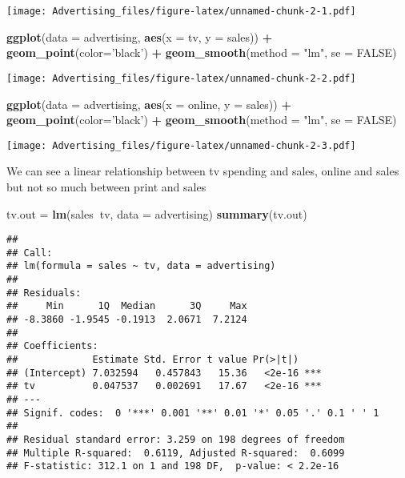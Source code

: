 \documentclass[
]{article}
\newenvironment{Shaded}{\begin{snugshade}}{\end{snugshade}}
\newcommand{\DataTypeTok}[1]{\textcolor[rgb]{0.13,0.29,0.53}{#1}}
\newcommand{\KeywordTok}[1]{\textcolor[rgb]{0.13,0.29,0.53}{\textbf{#1}}}
\newcommand{\NormalTok}[1]{#1}
\newcommand{\OperatorTok}[1]{\textcolor[rgb]{0.81,0.36,0.00}{\textbf{#1}}}
\newcommand{\OtherTok}[1]{\textcolor[rgb]{0.56,0.35,0.01}{#1}}
\newcommand{\StringTok}[1]{\textcolor[rgb]{0.31,0.60,0.02}{#1}}
\begin{document}
\texttt{[image: Advertising\_files/figure-latex/unnamed-chunk-2-1.pdf]}

\begin{Shaded}
\begin{Highlighting}[]
\KeywordTok{ggplot}\NormalTok{(}\DataTypeTok{data =}\NormalTok{ advertising, }\KeywordTok{aes}\NormalTok{(}\DataTypeTok{x =}\NormalTok{ tv, }\DataTypeTok{y =}\NormalTok{ sales)) }\OperatorTok{+}\StringTok{ }
\StringTok{  }\KeywordTok{geom_point}\NormalTok{(}\DataTypeTok{color=}\StringTok{'black'}\NormalTok{) }\OperatorTok{+}
\StringTok{  }\KeywordTok{geom_smooth}\NormalTok{(}\DataTypeTok{method =} \StringTok{"lm"}\NormalTok{, }\DataTypeTok{se =} \OtherTok{FALSE}\NormalTok{)}
\end{Highlighting}
\end{Shaded}

\texttt{[image: Advertising\_files/figure-latex/unnamed-chunk-2-2.pdf]}

\begin{Shaded}
\begin{Highlighting}[]
\KeywordTok{ggplot}\NormalTok{(}\DataTypeTok{data =}\NormalTok{ advertising, }\KeywordTok{aes}\NormalTok{(}\DataTypeTok{x =}\NormalTok{ online, }\DataTypeTok{y =}\NormalTok{ sales)) }\OperatorTok{+}\StringTok{ }
\StringTok{  }\KeywordTok{geom_point}\NormalTok{(}\DataTypeTok{color=}\StringTok{'black'}\NormalTok{) }\OperatorTok{+}
\StringTok{  }\KeywordTok{geom_smooth}\NormalTok{(}\DataTypeTok{method =} \StringTok{"lm"}\NormalTok{, }\DataTypeTok{se =} \OtherTok{FALSE}\NormalTok{)}
\end{Highlighting}
\end{Shaded}

\texttt{[image: Advertising\_files/figure-latex/unnamed-chunk-2-3.pdf]}

We can see a linear relationship between tv spending and sales, online
and sales but not so much between print and sales

\begin{Shaded}
\begin{Highlighting}[]
\NormalTok{tv.out =}\StringTok{ }\KeywordTok{lm}\NormalTok{(sales}\OperatorTok{~}\NormalTok{tv, }\DataTypeTok{data =}\NormalTok{ advertising)}
\KeywordTok{summary}\NormalTok{(tv.out)}
\end{Highlighting}
\end{Shaded}

\begin{verbatim}
## 
## Call:
## lm(formula = sales ~ tv, data = advertising)
## 
## Residuals:
##     Min      1Q  Median      3Q     Max 
## -8.3860 -1.9545 -0.1913  2.0671  7.2124 
## 
## Coefficients:
##             Estimate Std. Error t value Pr(>|t|)    
## (Intercept) 7.032594   0.457843   15.36   <2e-16 ***
## tv          0.047537   0.002691   17.67   <2e-16 ***
## ---
## Signif. codes:  0 '***' 0.001 '**' 0.01 '*' 0.05 '.' 0.1 ' ' 1
## 
## Residual standard error: 3.259 on 198 degrees of freedom
## Multiple R-squared:  0.6119, Adjusted R-squared:  0.6099 
## F-statistic: 312.1 on 1 and 198 DF,  p-value: < 2.2e-16
\end{verbatim}
\end{document}
